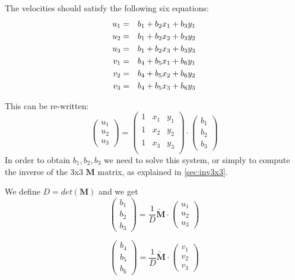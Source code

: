 The velocities should satisfy the following six equations:
\begin{eqnarray}
u_1 &=& b_1 + b_2x_1+b_3y_1 \nonumber\\
u_2 &=& b_1 + b_2x_2+b_3y_2 \nonumber\\
u_3 &=& b_1 + b_2x_3+b_3y_3 \nonumber\\
v_1 &=& b_4 + b_5x_1+b_6y_1 \nonumber\\
v_2 &=& b_4 + b_5x_2+b_6y_2 \nonumber\\
v_3 &=& b_4 + b_5x_3+b_6y_3 \nonumber
\end{eqnarray}

This can be re-written:
\[
\left(
\begin{array}{c}
u_1 \\ u_2 \\ u_3  
\end{array}
\right)
=
\left(
\begin{array}{ccc}
1 & x_1 & y_1 \\
1 & x_2 & y_2 \\
1 & x_3 & y_3 \\
\end{array}
\right)
\cdot
\left(
\begin{array}{c}
b_1 \\ b_2 \\ b_3  
\end{array}
\right)
\]
In order to obtain $b_1,b_2,b_3$ we need to solve this system, or simply to compute the
inverse of the 3x3 ${\bm M}$ matrix, as explained in \ref{sec:inv3x3}.

We define $D=det({\bm M})$ and we get
\[
\left(
\begin{array}{c}
b_1 \\ b_2 \\ b_3  
\end{array}
\right)
=
\frac{1}{D}
\tilde{\bm M}
\cdot
\left(
\begin{array}{c}
u_1 \\ u_2 \\ u_3  
\end{array}
\right)
\]

\[
\left(
\begin{array}{c}
b_4 \\ b_5 \\ b_6  
\end{array}
\right)
=
\frac{1}{D}
\tilde{\bm M}
\cdot
\left(
\begin{array}{c}
v_1 \\ v_2 \\ v_3  
\end{array}
\right)
\]

